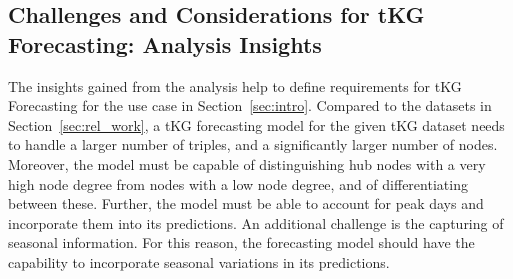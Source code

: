\subsection{Challenges and Considerations for tKG Forecasting: Analysis Insights}\label{sec:takeaway}
The insights gained from the analysis help to define requirements for tKG Forecasting for the use case in Section~\ref{sec:intro}. 
Compared to the datasets in Section~\ref{sec:rel_work}, a tKG forecasting model for the given tKG dataset needs to handle a larger number of triples, and a significantly larger number of nodes. Moreover, the model must be capable of distinguishing hub nodes with a very high node degree from nodes with a low node degree, and of differentiating between these. 
Further, the model must be able to account for peak days and incorporate them into its predictions. An additional challenge is the capturing of seasonal information. For this reason, the forecasting model should have the capability to incorporate seasonal variations in its predictions.
